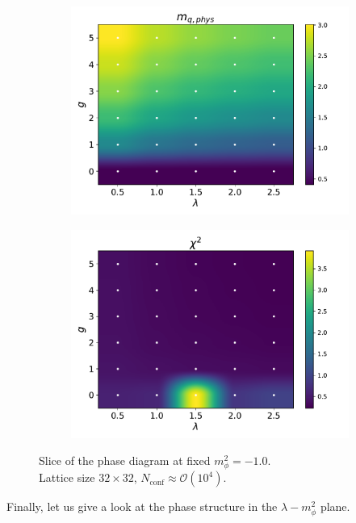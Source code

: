 \begin{figure}[htp]
\begin{subfigure}[b]{0.47\textwidth}
        \includegraphics[width=\textwidth]{figures/phase_diagram/g-lam/phase_diagram_mqphys.pdf}
    \end{subfigure}
    \begin{subfigure}[b]{0.47\textwidth}
        \includegraphics[width=\textwidth]{figures/phase_diagram/g-lam/phase_diagram_chi2.pdf}
    \end{subfigure}
    \caption{Slice of the phase diagram at fixed $m_\phi^2 = -1.0$. \\ Lattice size $32 \times 32$, $N_\text{conf} \approx \mathcal{O}(10^4)$.}
    \label{fig:phase_diagram_g_lam}
\end{figure} \newpage
Finally, let us give a look at the phase structure in the $\lambda - m_\phi^2$ plane. 
